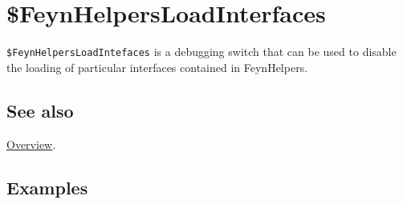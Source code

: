 \documentclass[../FeynHelpersManual.tex]{subfiles}
\begin{document}
\hypertarget{dollarfeynhelpersloadinterfaces}{
\section{\$FeynHelpersLoadInterfaces}\label{dollarfeynhelpersloadinterfaces}}

\texttt{\$FeynHelpersLoadIntefaces} is a debugging switch that can be
used to disable the loading of particular interfaces contained in
FeynHelpers.

\subsection{See also}

\hyperlink{toc}{Overview}.

\subsection{Examples}
\end{document}
